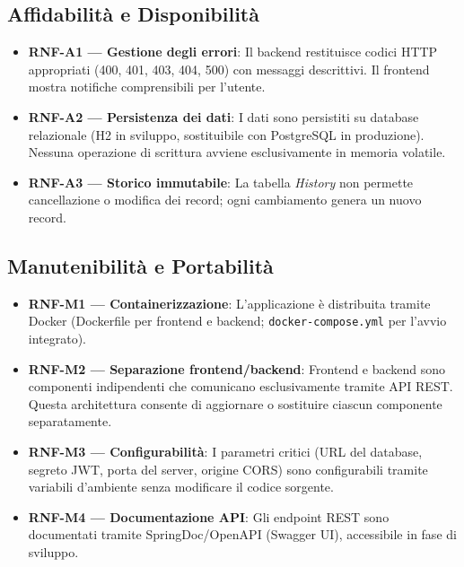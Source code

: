 \subsection{Affidabilità e Disponibilità}

\begin{itemize}
    \item \textbf{RNF-A1 --- Gestione degli errori}: Il backend restituisce codici HTTP appropriati (400, 401, 403, 404, 500) con messaggi descrittivi. Il frontend mostra notifiche comprensibili per l'utente.
    \item \textbf{RNF-A2 --- Persistenza dei dati}: I dati sono persistiti su database relazionale (H2 in sviluppo, sostituibile con PostgreSQL in produzione). Nessuna operazione di scrittura avviene esclusivamente in memoria volatile.
    \item \textbf{RNF-A3 --- Storico immutabile}: La tabella \textit{History} non permette cancellazione o modifica dei record; ogni cambiamento genera un nuovo record.
\end{itemize}

\subsection{Manutenibilità e Portabilità}

\begin{itemize}
    \item \textbf{RNF-M1 --- Containerizzazione}: L'applicazione è distribuita tramite Docker (Dockerfile per frontend e backend; \texttt{docker-compose.yml} per l'avvio integrato).
    \item \textbf{RNF-M2 --- Separazione frontend/backend}: Frontend e backend sono componenti indipendenti che comunicano esclusivamente tramite API REST. Questa architettura consente di aggiornare o sostituire ciascun componente separatamente.
    \item \textbf{RNF-M3 --- Configurabilità}: I parametri critici (URL del database, segreto JWT, porta del server, origine CORS) sono configurabili tramite variabili d'ambiente senza modificare il codice sorgente.
    \item \textbf{RNF-M4 --- Documentazione API}: Gli endpoint REST sono documentati tramite SpringDoc/OpenAPI (Swagger UI), accessibile in fase di sviluppo.
\end{itemize}

